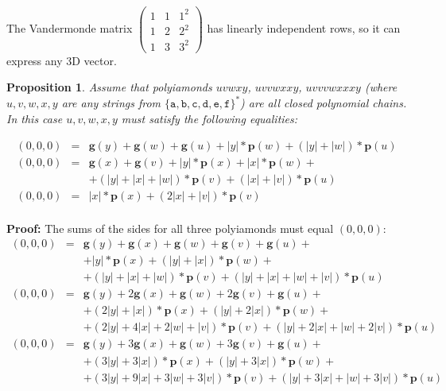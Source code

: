 \documentclass[a4paper,12pt]{article}
\newtheorem{proposition}{\bf Proposition}[section]
\begin{document}
The Vandermonde matrix
${\displaystyle 
\begin{pmatrix}
1 & 1 & 1^2 \\
1 & 2 & 2^2 \\
1 & 3 & 3^2
\end{pmatrix}
}$
has linearly independent rows, so it can express any 3D vector.



\begin{proposition}
Assume that polyiamonds $uvwxy$, $uvvwxxy$, $uvvvwxxxy$ (where $u,v,w,x,y$ are any strings 
from $\{\mathtt{a}, \mathtt{b}, \mathtt{c}, \mathtt{d}, \mathtt{e}, \mathtt{f}\}^{\ast}$) are all closed polynomial 
chains. In this case $u,v,w,x,y$ must satisfy the following equalities:

\[
\begin{array}{rcl}
(0,0,0) & = & \mathbf{g}(y) + \mathbf{g}(w) + \mathbf{g}(u) + |y| * \mathbf{p}(w) + 
(|y|+|w|) * \mathbf{p}(u)  \\
(0,0,0) & = & \mathbf{g}(x) + \mathbf{g}(v) + |y| * \mathbf{p}(x) + |x|*\mathbf{p}(w)+ \\
 & & + (|y|+|x|+|w|)*\mathbf{p}(v)+ (|x|+|v|)*\mathbf{p}(u) \\
(0,0,0) & = & |x| * \mathbf{p}(x) + (2|x|+|v|) * \mathbf{p}(v) \\
\end{array}
\]
\end{proposition}

{\bf Proof:} The sums of the sides for all three polyiamonds must equal $(0,0,0)$: 
\[
\begin{array}{rcl}
(0,0,0) & = & \mathbf{g}(y) + \mathbf{g}(x)  + \mathbf{g}(w) + \mathbf{g}(v) + \mathbf{g}(u) + \\
 & &  +|y|*\mathbf{p}(x) + (|y|+|x|)*\mathbf{p}(w) + \\
 & &  +(|y|+|x|+|w|)*\mathbf{p}(v) + (|y|+|x|+|w|+|v|)*\mathbf{p}(u) \\
(0,0,0) & = & \mathbf{g}(y)+2\mathbf{g}(x)+\mathbf{g}(w)+2\mathbf{g}(v)+\mathbf{g}(u) + \\
 & & + (2|y|+|x|)*\mathbf{p}(x)  +(|y|+2|x|)*\mathbf{p}(w) +\\
 & & + (2|y|+4|x|+2|w|+|v|)*\mathbf{p}(v)+ (|y|+2|x|+|w|+2|v|)*\mathbf{p}(u) \\
(0,0,0) & = & \mathbf{g}(y)+3\mathbf{g}(x)+\mathbf{g}(w)+3\mathbf{g}(v)+\mathbf{g}(u)+ \\
 & & +(3|y|+3|x|)*\mathbf{p}(x)+(|y|+3|x|)*\mathbf{p}(w) + \\ 
 & & +(3|y|+9|x|+3|w|+3|v|)*\mathbf{p}(v)+(|y|+3|x|+|w|+3|v|)*\mathbf{p}(u) \\
\end{array}
\]
\end{document}
